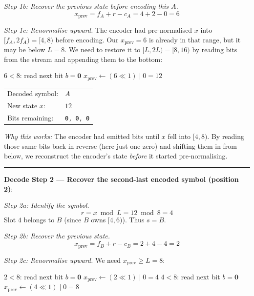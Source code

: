 \begin{examplebox}
\medskip
\noindent\emph{Step 1b: Recover the previous state before encoding this $A$.}
\[
x_{\text{prev}} = f_A + r - c_A = 4 + 2 - 0 = 6
\]

\noindent\emph{Step 1c: Renormalise upward.}
The encoder had pre-normalised $x$ into $[f_A, 2f_A) = [4,8)$
before encoding.  Our $x_{\text{prev}} = 6$ is already in that range,
but it may be below $L = 8$.  We need to restore it to $[L, 2L) = [8,16)$
by reading bits from the stream and appending them to the bottom:

\begin{algorithmic}[1]
    \State $6 < 8$: read next bit $b = \mathbf{0}$
    \State $x_{\text{prev}} \leftarrow (6 \ll 1) \mid 0 = 12$
\EndWhile
{}
\end{algorithmic}

\begin{center}
\begin{tabular}{@{}ll@{}}
  Decoded symbol: & $A$ \\
  New state $x$:  & $12$ \\
  Bits remaining: & \texttt{0, 0, 0} \\
\end{tabular}
\end{center}

\noindent\textit{Why this works:} The encoder had emitted bits
until $x$ fell into $[4,8)$.  By reading those same bits back
in reverse (here just one zero) and shifting them in from below,
we reconstruct the encoder's state \emph{before} it started
pre-normalising.

\medskip\hrule\medskip

\noindent\textbf{Decode Step 2 — Recover the second-last encoded symbol (position 2)}:

\medskip
\noindent\emph{Step 2a: Identify the symbol.}
\[
r = x \bmod L = 12 \bmod 8 = 4
\]
Slot $4$ belongs to $B$ (since $B$ owns $[4,6)$).  Thus $s = B$.

\medskip
\noindent\emph{Step 2b: Recover the previous state.}
\[
x_{\text{prev}} = f_B + r - c_B = 2 + 4 - 4 = 2
\]

\noindent\emph{Step 2c: Renormalise upward.}
We need $x_{\text{prev}} \ge L = 8$:

\begin{algorithmic}[1]
    \State $2 < 8$: read next bit $b = \mathbf{0}$
    \State $x_{\text{prev}} \leftarrow (2 \ll 1) \mid 0 = 4$
    \State $4 < 8$: read next bit $b = \mathbf{0}$
    \State $x_{\text{prev}} \leftarrow (4 \ll 1) \mid 0 = 8$
\EndWhile
{}
\end{algorithmic}


\end{examplebox}

